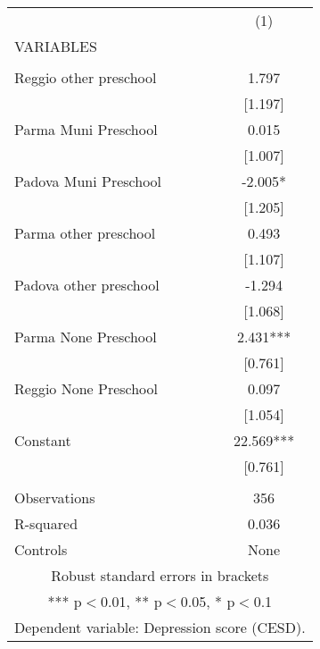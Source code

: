 \begin{tabular}{lc} \hline
 & (1) \\
VARIABLES &  \\ \hline
 &  \\
Reggio other preschool & 1.797 \\
 & [1.197] \\
Parma Muni Preschool & 0.015 \\
 & [1.007] \\
Padova Muni Preschool & -2.005* \\
 & [1.205] \\
Parma other preschool & 0.493 \\
 & [1.107] \\
Padova other preschool & -1.294 \\
 & [1.068] \\
Parma None Preschool & 2.431*** \\
 & [0.761] \\
Reggio None Preschool & 0.097 \\
 & [1.054] \\
Constant & 22.569*** \\
 & [0.761] \\
 &  \\
Observations & 356 \\
R-squared & 0.036 \\
 Controls & None \\ \hline
\multicolumn{2}{c}{ Robust standard errors in brackets} \\
\multicolumn{2}{c}{ *** p$<$0.01, ** p$<$0.05, * p$<$0.1} \\
\multicolumn{2}{c}{ Dependent variable: Depression score (CESD).} \\
\end{tabular}
